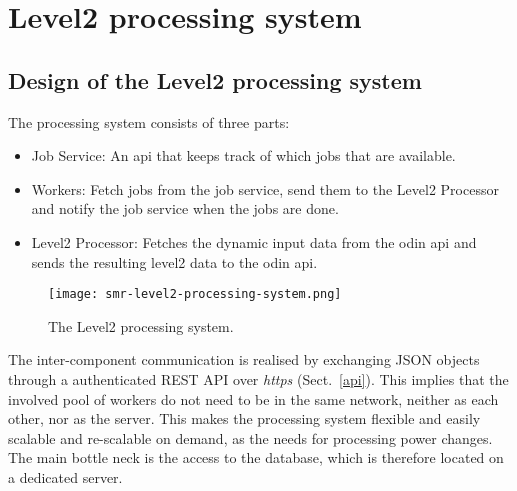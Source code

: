\chapter{Level2 processing system}

\section{Design of the Level2 processing system}

The processing system consists of three parts:

\begin{itemize}
\item Job Service: An api that keeps track of which jobs that are available.
\item Workers: Fetch jobs from the job service, send them to the Level2
  Processor and notify the job service when the jobs are done.
\item Level2 Processor: Fetches the dynamic input data from the odin api
  and sends the resulting level2 data to the odin api.
\end{itemize}

\begin{figure}[h]
  \centering
  \texttt{[image: smr-level2-processing-system.png]}
  \caption{The Level2 processing system.}
  \label{fig:processing}
\end{figure}

The inter-component communication is realised by exchanging JSON objects
through a authenticated REST API over \emph{https} (Sect.~\ref{api}). This
implies that the involved pool of workers do not need to be in the same
network, neither as each other, nor as the server. This makes the processing
system flexible and easily scalable and re-scalable on demand, as the needs for
processing power changes. The main bottle neck is the access to the database,
which is therefore located on a dedicated server.

